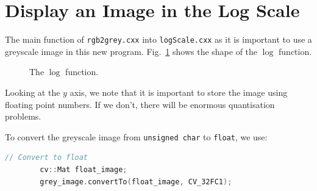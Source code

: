 \documentclass[english,a4paper,12pt,oneside]{article}
\begin{document}
%


%


\section{Display an Image in the Log Scale}

The main function of \verb+rgb2grey.cxx+ into \verb+logScale.cxx+ as it is important to use a greyscale image in this new program. 
Fig.~\ref{fig:log} shows the shape of the $\log$ function. 
    \begin {figure}[htb]
      \begin{center}
        
      \end{center}
      \caption{\label{fig:log}The $\log$ function.}
    \end {figure}
Looking at the $y$ axis, we note that it is important to store the image using floating point numbers. 
If we don't, there will be enormous quantisation problems. 

To convert the greyscale image from \verb+unsigned char+ to \verb+float+, we use:
\begin{lstlisting}[language=c++,caption=Convert an image into floating point numbers.]
        // Convert to float
        cv::Mat float_image;
        grey_image.convertTo(float_image, CV_32FC1);
\end{lstlisting}
\end{document}
